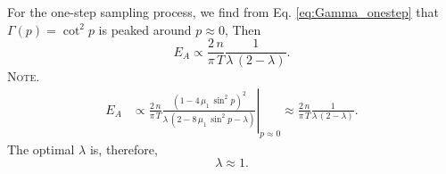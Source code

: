 \documentclass[preprint, floatfix]{revtex4-1}
\newcommand{\note}[1]{{\color{DarkGreen}\footnotesize \textsc{Note.} #1}}
\newcommand{\Err}{E}
\begin{document}
For the one-step sampling process,
we find from Eq. \eqref{eq:Gamma_onestep}
that $\Gamma(p) = \cot^2 p$
is peaked around $p \approx 0$,
%
Then
$$
  \Err_A
  \propto
  \frac{   2 \, n }
       { \pi \, T }
  \frac{             1             }
       {  \lambda \, (2 - \lambda) }
  .
$$
\note{
$$
\begin{aligned}
  \Err_A
  &
  \propto
  \frac{   2 \, n }
       { \pi \, T }
  \left.
  \frac{            \left(1 - 4 \, \mu_1 \, \sin^2 p \right)^2         }
       { \lambda \, \left(2 - 8 \, \mu_1 \, \sin^2 p - \lambda \right) }
  \right|_{ p \approx 0 }
  \approx
  \frac{   2 \, n }
       { \pi \, T }
  \frac{             1             }
       {  \lambda \, (2 - \lambda) }
  .
\end{aligned}
$$
}%
%
The optimal $\lambda$ is, therefore,
%
\begin{equation}
\lambda \approx 1.
\label{eq:lambda_nn_onestep}
\end{equation}
%
\end{document}
